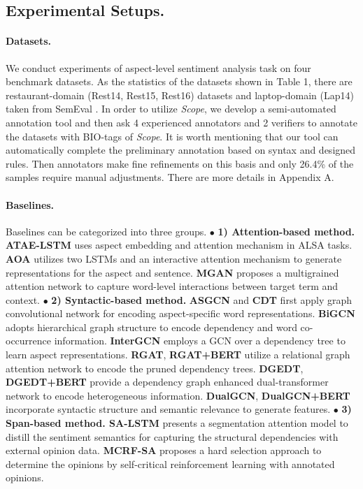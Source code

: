 \documentclass{article}
\begin{document}
\subsection{Experimental Setups.}
\paragraph{Datasets.} We conduct experiments of aspect-level sentiment analysis task on four benchmark datasets. As the statistics of the datasets shown in Table 1, there are  restaurant-domain (Rest14, Rest15, Rest16) datasets and laptop-domain (Lap14) taken from SemEval \cite{maria2014semeval,pontiki2015semeval,pontiki2016semeval}. In order to utilize \emph{Scope}, we develop a semi-automated annotation tool and then ask 4 experienced annotators and 2 verifiers to annotate the datasets with BIO-tags of \emph{Scope}. It is worth mentioning that our tool can automatically complete the preliminary annotation based on syntax and designed rules. Then annotators make fine refinements on this basis and only 26.4\% of the samples require manual adjustments. There are more details in Appendix A.


\paragraph{Baselines.}
Baselines can be categorized into three groups.  $\bullet$ \textbf{1) Attention-based method.} \textbf{ATAE-LSTM} \cite{wang2016attention} uses aspect embedding and attention mechanism in ALSA tasks. \textbf{AOA} \cite{huang2018aspect} utilizes two LSTMs and an interactive attention mechanism to generate representations for the aspect and sentence. \textbf{MGAN} \cite{fan2018multi} proposes a multigrained attention network to capture word-level interactions between target term and context. $\bullet$ \textbf{2) Syntactic-based method.} \textbf{ASGCN} \cite{zhang2019aspect} and \textbf{CDT} \cite{sun2019aspect} first apply graph convolutional network for encoding aspect-specific word representations. \textbf{BiGCN} \cite{zhang2020convolution} adopts hierarchical graph structure to encode dependency and word co-occurrence information. \textbf{InterGCN} \cite{liang2020jointly} employs a GCN over a dependency tree to learn aspect representations. \textbf{RGAT}, \textbf{RGAT+BERT} 
\cite{wang2020relational} utilize a relational graph attention network to encode the pruned dependency trees. \textbf{DGEDT}, \textbf{DGEDT+BERT} \cite{tang2020dependency} provide a dependency graph enhanced dual-transformer network to encode heterogeneous information. \textbf{DualGCN}, \textbf{DualGCN+BERT} \cite{rui2021dual} incorporate syntactic structure and semantic relevance to generate features. $\bullet$ \textbf{3) Span-based method. SA-LSTM}  \cite{wang2018learning} presents a segmentation attention model to distill the sentiment semantics for capturing the structural dependencies with external opinion data. \textbf{MCRF-SA} \cite{xu2020aspect} proposes a hard selection approach to determine the opinions by self-critical reinforcement learning with annotated opinions.
\end{document}
